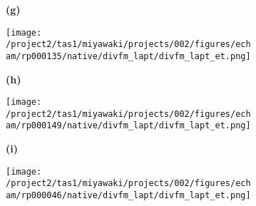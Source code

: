 \documentclass[preview]{standalone}
\begin{document}
\begin{figure}
  \begin{subfigure}[t]{0.05\textwidth}
    \textbf{\normalsize{(g)}}
  \end{subfigure}
  \begin{subfigure}[t]{0.45\textwidth}
    \texttt{[image: /project2/tas1/miyawaki/projects/002/figures/echam/rp000135/native/divfm\_lapt/divfm\_lapt\_et.png]}
  \end{subfigure}
  \begin{subfigure}[t]{0.05\textwidth}
    \textbf{\normalsize{(h)}}
  \end{subfigure}
  \begin{subfigure}[t]{0.45\textwidth}
    \texttt{[image: /project2/tas1/miyawaki/projects/002/figures/echam/rp000149/native/divfm\_lapt/divfm\_lapt\_et.png]}
  \end{subfigure}
  
  \begin{subfigure}[t]{0.05\textwidth}
    \textbf{\normalsize{(i)}}
  \end{subfigure}
  \begin{subfigure}[t]{0.45\textwidth}
    \texttt{[image: /project2/tas1/miyawaki/projects/002/figures/echam/rp000046/native/divfm\_lapt/divfm\_lapt\_et.png]}
  \end{subfigure}
\end{figure}
\end{document}
